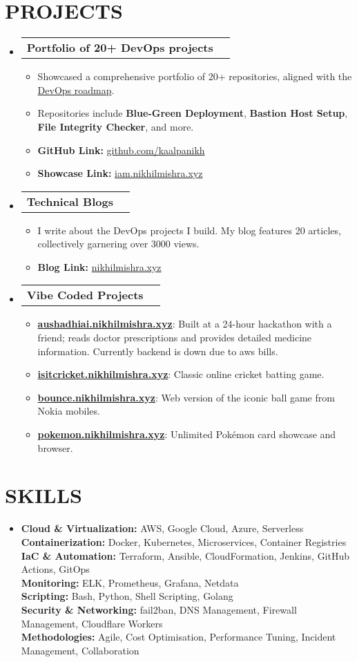 \documentclass[letterpaper,11pt]{article}
\makeatletter
\newcommand{\resumeItem}[1]{%
  \item\small{#1\vspace{-2pt}}%
}
\newcommand{\resumeProjectHeading}[2]{%
  \item%
  \begin{tabular*}{0.97\textwidth}{l@{\extracolsep{\fill}}r}%
    \small \textbf{#1} & #2 \\
  \end{tabular*}\vspace{-7pt}%
}
\newcommand{\resumeSubHeadingListStart}{\begin{itemize}[leftmargin=0.15in, label={}]}
\newcommand{\resumeSubHeadingListEnd}{\end{itemize}}
\newcommand{\resumeItemListStart}{\begin{itemize}}
\newcommand{\resumeItemListEnd}{\end{itemize}\vspace{-5pt}}
\makeatother
\begin{document}
\section{PROJECTS}
  \resumeSubHeadingListStart
    \resumeProjectHeading
      {\textbf{Portfolio of 20+ DevOps projects}}{}
      \resumeItemListStart
        \resumeItem{Showcased a comprehensive portfolio of 20+ repositories, aligned with the \href{https://roadmap.sh/projects?g=devops}{DevOps roadmap}.}
        \resumeItem{Repositories include \textbf{Blue-Green Deployment}, \textbf{Bastion Host Setup}, \textbf{File Integrity Checker}, and more.}
        \resumeItem{\textbf{GitHub Link:} \href{https://github.com/kaalpanikh}{github.com/kaalpanikh}}
        \resumeItem{\textbf{Showcase Link:} \href{https://iam.nikhilmishra.xyz}{iam.nikhilmishra.xyz}}
      \resumeItemListEnd
    \resumeProjectHeading
      {\textbf{Technical Blogs}}{}
      \resumeItemListStart
        \resumeItem{I write about the DevOps projects I build. My blog features 20 articles, collectively garnering over 3000 views.}
        \resumeItem{\textbf{Blog Link:} \href{https://nikhilmishra.xyz}{nikhilmishra.xyz}}
      \resumeItemListEnd
    \resumeProjectHeading
  {\textbf{Vibe Coded Projects}}{}
  \resumeItemListStart
    \resumeItem{\textbf{\href{https://aushadhiai.nikhilmishra.xyz}{aushadhiai.nikhilmishra.xyz}}: Built at a 24-hour hackathon with a friend; reads doctor prescriptions and provides detailed medicine information. Currently backend is down due to aws bills.}
    \resumeItem{\textbf{\href{https://isitcricket.nikhilmishra.xyz}{isitcricket.nikhilmishra.xyz}}: Classic online cricket batting game.}
    \resumeItem{\textbf{\href{https://bounce.nikhilmishra.xyz}{bounce.nikhilmishra.xyz}}: Web version of the iconic ball game from Nokia mobiles.}
    \resumeItem{\textbf{\href{https://pokemon.nikhilmishra.xyz}{pokemon.nikhilmishra.xyz}}: Unlimited Pokémon card showcase and browser.}
  \resumeItemListEnd

  \resumeSubHeadingListEnd

\section{SKILLS}
  \resumeSubHeadingListStart
    \item{
      \textbf{Cloud \& Virtualization:} AWS, Google Cloud, Azure, Serverless \\
      \textbf{Containerization:} Docker, Kubernetes, Microservices, Container Registries \\
      \textbf{IaC \& Automation:} Terraform, Ansible, CloudFormation, Jenkins, GitHub Actions, GitOps \\
      \textbf{Monitoring:} ELK, Prometheus, Grafana, Netdata \\
      \textbf{Scripting:} Bash, Python, Shell Scripting, Golang\\
      \textbf{Security \& Networking:} fail2ban, DNS Management, Firewall Management, Cloudflare Workers \\
      \textbf{Methodologies:} Agile, Cost Optimisation, Performance Tuning, Incident Management, Collaboration
    }
  \resumeSubHeadingListEnd
\end{document}
